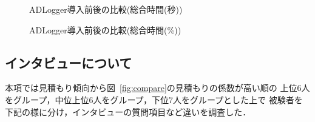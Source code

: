\begin{figure}[ht]
	\begin{center}
		\caption{ADLogger導入前後の比較(総合時間(秒))}
		\label{fig:13}
	\end{center}
\end{figure}

\begin{figure}[ht]
	\begin{center}
		\caption{ADLogger導入前後の比較(総合時間(\%))}
		\label{fig:14}
	\end{center}
\end{figure}




\subsection{インタビューについて}
本項では見積もり傾向から図~\ref{fig:compare}の見積もりの係数が高い順の
上位6人をグループ，中位上位6人をグループ，下位7人をグループとした上で
被験者を下記の様に分け，インタビューの質問項目など違いを調査した．

